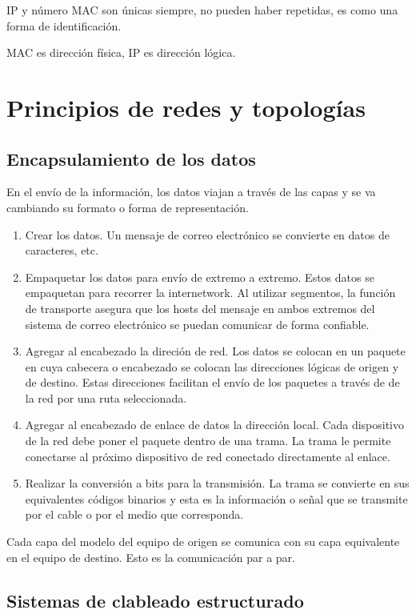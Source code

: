 IP y número MAC son únicas siempre, no pueden haber repetidas, es como una forma de identificación.

MAC es dirección física, IP es dirección lógica.


\section{Principios de redes y topologías}

\subsection{Encapsulamiento de los datos}

En el envío de la información, los datos viajan a través de las capas y se va cambiando su formato o forma de representación. 

\begin{enumerate}
    \item Crear los datos. Un mensaje de correo electrónico se convierte en datos de caracteres, etc.
    \item Empaquetar los datos para envío de extremo a extremo. Estos datos se empaquetan para recorrer la internetwork. Al utilizar segmentos, la función de transporte asegura que los hosts del mensaje en ambos extremos del sistema de correo electrónico se puedan comunicar de forma confiable.
    \item Agregar al encabezado la direción de red. Los datos se colocan en un paquete en cuya cabecera o encabezado se colocan las direcciones lógicas de origen y de destino. Estas direcciones facilitan el envío de los paquetes a través de de la red por una ruta seleccionada.
    \item Agregar al encabezado de enlace de datos la dirección local. Cada dispositivo de la red debe poner el paquete dentro de una trama. La trama le permite conectarse al próximo dispositivo de red conectado directamente al enlace. 
    \item Realizar la conversión a bits para la transmisión. La trama se convierte en sus equivalentes códigos binarios y esta es la información o señal que se transmite por el cable o por el medio que corresponda.
\end{enumerate}

Cada capa del modelo del equipo de origen se comunica con su capa equivalente en el equipo de destino. Esto es la comunicación par a par.

\subsection{Sistemas de clableado estructurado}

